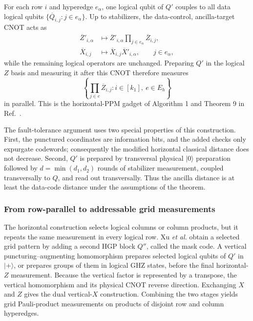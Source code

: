 \documentclass[11pt]{article}
\begin{document}
For each row $i$ and hyperedge $e_\alpha$, one logical qubit of $Q'$ couples to
all data logical qubits $\{\overline Q_{i,j}:j\in e_\alpha\}$. Up to
stabilizers, the data-control, ancilla-target CNOT acts as
\begin{align}
  \overline Z'_{i,\alpha}
  &\longmapsto
  \overline Z'_{i,\alpha}
  \prod_{j\in e_\alpha}\overline Z_{i,j},
  \label{eq:hgp-logical-z-action}\\
  \overline X_{i,j}
  &\longmapsto
  \overline X_{i,j}\overline X'_{i,\alpha},
  \qquad j\in e_\alpha,
  \label{eq:hgp-logical-x-action}
\end{align}
while the remaining logical operators are unchanged. Preparing $Q'$ in the
logical $Z$ basis and measuring it after this CNOT therefore measures
\begin{equation}
  \left\{
  \prod_{j\in e}\overline Z_{i,j}
  : i\in[k_1],\ e\in E_h
  \right\}
  \label{eq:horizontal-ppms}
\end{equation}
in parallel. This is the horizontal-PPM gadget of Algorithm 1 and Theorem 9
in Ref.~\cite{XuEtAl2024}.

The fault-tolerance argument uses two special properties of this construction.
First, the punctured coordinates are information bits, and the added checks
only expurgate codewords; consequently the modified horizontal classical
distance does not decrease. Second, $Q'$ is prepared by transversal physical
$|0\rangle$ preparation followed by $d=\min(d_1,d_2)$ rounds of stabilizer
measurement, coupled transversally to $Q$, and read out transversally. Thus the
ancilla distance is at least the data-code distance under the assumptions of
the theorem.

\subsubsection{From row-parallel to addressable grid measurements}

The horizontal construction selects logical columns or column products, but
it repeats the same measurement in every logical row. Xu \emph{et al.}
obtain a selected grid pattern by adding a second HGP block $Q''$, called the
mask code. A vertical puncturing--augmenting homomorphism prepares selected
logical qubits of $Q'$ in $|+\rangle$, or prepares groups of them in logical
GHZ states, before the final horizontal-$Z$ measurement. Because the vertical
factor is represented by a transpose, the vertical homomorphism and its
physical CNOT reverse direction. Exchanging $X$ and $Z$ gives the dual
vertical-$X$ construction. Combining the two stages yields grid Pauli-product
measurements on products of disjoint row and column hyperedges.
\end{document}
